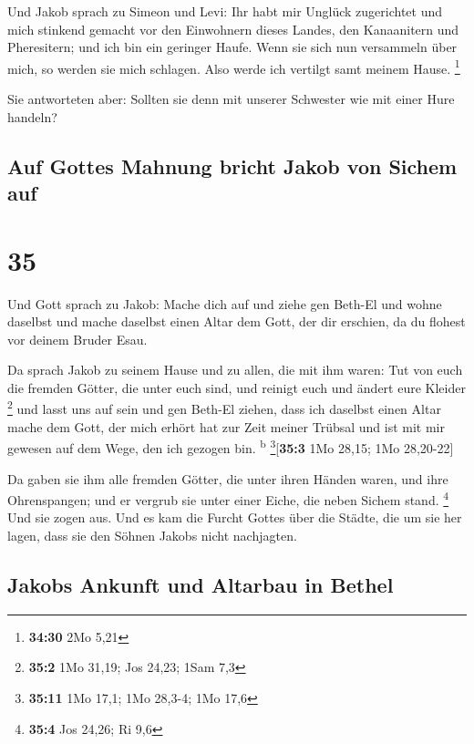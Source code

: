  Und Jakob sprach zu Simeon und Levi: Ihr habt mir
Unglück zugerichtet und mich stinkend gemacht vor den Einwohnern dieses
Landes, den Kanaanitern und Pheresitern; und ich bin ein geringer Haufe.
Wenn sie sich nun versammeln über mich, so werden sie mich schlagen.
Also werde ich vertilgt samt meinem Hause. \footnote{\textbf{34:30} 2Mo
  5,21}

 Sie antworteten aber: Sollten sie denn mit unserer
Schwester wie mit einer Hure handeln?

\hypertarget{auf-gottes-mahnung-bricht-jakob-von-sichem-auf}{%
\subsection{Auf Gottes Mahnung bricht Jakob von Sichem
auf}\label{auf-gottes-mahnung-bricht-jakob-von-sichem-auf}}

\hypertarget{section-34}{%
\section{35}\label{section-34}}

 Und Gott sprach zu Jakob: Mache dich auf und ziehe gen
Beth-El und wohne daselbst und mache daselbst einen Altar dem Gott, der
dir erschien, da du flohest vor deinem Bruder Esau.

 Da sprach Jakob zu seinem Hause und zu allen, die mit ihm
waren: Tut von euch die fremden Götter, die unter euch sind, und reinigt
euch und ändert eure Kleider \footnote{\textbf{35:2} 1Mo 31,19; Jos
  24,23; 1Sam 7,3}  und lasst uns auf sein und gen Beth-El
ziehen, dass ich daselbst einen Altar mache dem Gott, der mich erhört
hat zur Zeit meiner Trübsal und ist mit mir gewesen auf dem Wege, den
ich gezogen bin. \textsuperscript{b} \footnote{\textbf{35:11} 1Mo 17,1;
  1Mo 28,3-4; 1Mo 17,6}{[}\textbf{35:3} 1Mo 28,15; 1Mo 28,20-22{]}

 Da gaben sie ihm alle fremden Götter, die unter ihren
Händen waren, und ihre Ohrenspangen; und er vergrub sie unter einer
Eiche, die neben Sichem stand. \footnote{\textbf{35:4} Jos 24,26; Ri 9,6}
 Und sie zogen aus. Und es kam die Furcht Gottes über die
Städte, die um sie her lagen, dass sie den Söhnen Jakobs nicht
nachjagten.

\hypertarget{jakobs-ankunft-und-altarbau-in-bethel}{%
\subsection{Jakobs Ankunft und Altarbau in
Bethel}\label{jakobs-ankunft-und-altarbau-in-bethel}}

